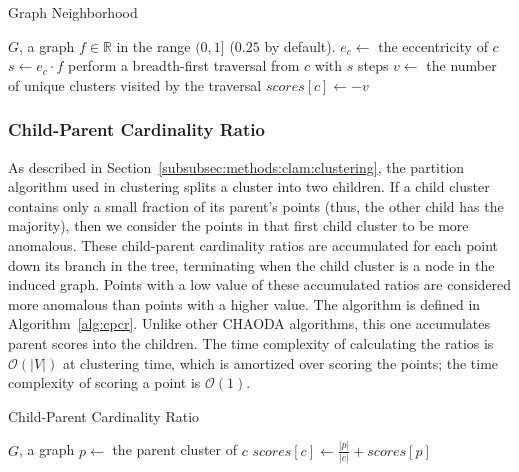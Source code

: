 \begin{algorithm}[h]
    \caption{Graph Neighborhood}
    \label{alg:gns}
\begin{algorithmic}[1]
    \REQUIRE $G$, a graph
    \REQUIRE $f \in \mathbb{R}$ in the range $(0,1]$ ($0.25$ by default).
        \STATE $e_c \gets$ the eccentricity of $c$
        \STATE $s \gets e_c \cdot f$
        \STATE perform a breadth-first traversal from $c$ with $s$ steps
        \STATE $v \gets$ the number of unique clusters visited by the traversal
        \STATE $scores[c] \gets -v$
    \ENDFOR
\end{algorithmic}
\end{algorithm}

\subsubsection{Child-Parent Cardinality Ratio}
\label{subsubsec:methods:individual-algorithms:cpcr}
As described in Section~\ref{subsubsec:methods:clam:clustering}, the partition algorithm used in clustering splits a cluster into two children.
If a child cluster contains only a small fraction of its parent's points (thus, the other child has the majority), then we consider the points in that first child cluster to be more anomalous.
These child-parent cardinality ratios are accumulated for each point down its branch in the tree, terminating when the child cluster is a node in the induced graph.
Points with a low value of these accumulated ratios are considered more anomalous than points with a higher value.
The algorithm is defined in Algorithm~\ref{alg:cpcr}.
Unlike other CHAODA algorithms, this one accumulates parent scores into the children.
The time complexity of calculating the ratios is $\mathcal{O}(|V|)$ at clustering time, which is amortized over scoring the points;
the time complexity of scoring a point is $\mathcal{O}(1)$.

\begin{algorithm}[h]
    \caption{Child-Parent Cardinality Ratio}
    \label{alg:cpcr}
\begin{algorithmic}[1]
    \REQUIRE $G$, a graph
        \STATE $p \gets$ the parent cluster of $c$
        \STATE $scores[c] \gets \frac{|p|}{|c|} + scores[p]$
    \ENDFOR
\end{algorithmic}
\end{algorithm}

